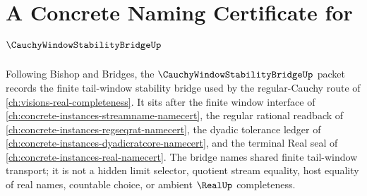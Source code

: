 \chapter{A Concrete Naming Certificate for $\CauchyWindowStabilityBridgeUp$}
\label{ch:concrete-instances-cauchy-window-stability-bridge-namecert}

Following Bishop and Bridges, the $\CauchyWindowStabilityBridgeUp$ packet records the finite tail-window stability bridge used by the regular-Cauchy route of \autoref{ch:visions-real-completeness}. It sits after the finite window interface of \autoref{ch:concrete-instances-streamname-namecert}, the regular rational readback of \autoref{ch:concrete-instances-regseqrat-namecert}, the dyadic tolerance ledger of \autoref{ch:concrete-instances-dyadicratcore-namecert}, and the terminal Real seal of \autoref{ch:concrete-instances-real-namecert}. The bridge names shared finite tail-window transport; it is not a hidden limit selector, quotient stream equality, host equality of real names, countable choice, or ambient $\RealUp$ completeness.

